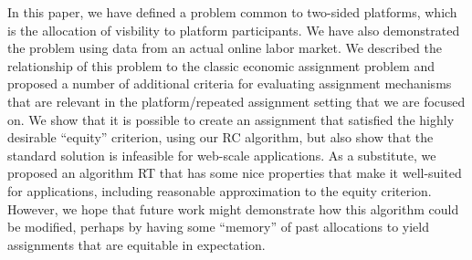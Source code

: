 \documentclass[prodmode,acmec]{acmsmall}
\begin{document}
In this paper, we have defined a problem common to two-sided
platforms, which is the allocation of visbility to platform
participants. We have also demonstrated the problem using data from an
actual online labor market. We described the relationship of this
problem to the classic economic assignment problem and proposed a
number of additional criteria for evaluating assignment mechanisms that
are relevant in the platform/repeated assignment setting that we are
focused on. We show that it is possible to create an assignment that
satisfied the highly desirable ``equity'' criterion, using our RC
algorithm, but also show that the standard solution is infeasible for
web-scale applications.  As a substitute, we proposed an algorithm RT
that has some nice properties that make it well-suited for
applications, including reasonable approximation to the equity
criterion. However, we hope that future work might demonstrate how
this algorithm could be modified, perhaps by having some ``memory'' of
past allocations to yield assignments that are equitable in
expectation.




\end{document}
